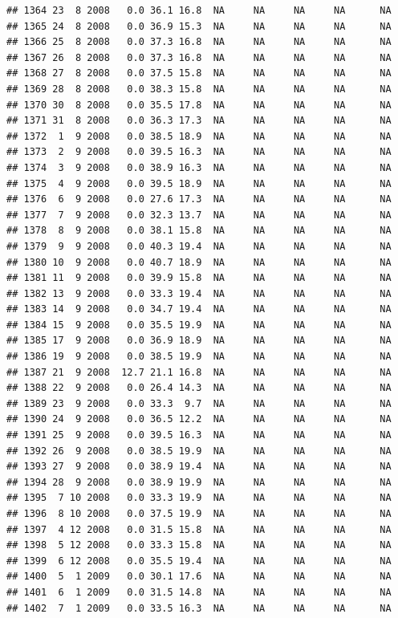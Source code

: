 \documentclass[
]{book}
\begin{document}
\begin{verbatim}
## 1364 23  8 2008   0.0 36.1 16.8  NA     NA     NA     NA      NA
## 1365 24  8 2008   0.0 36.9 15.3  NA     NA     NA     NA      NA
## 1366 25  8 2008   0.0 37.3 16.8  NA     NA     NA     NA      NA
## 1367 26  8 2008   0.0 37.3 16.8  NA     NA     NA     NA      NA
## 1368 27  8 2008   0.0 37.5 15.8  NA     NA     NA     NA      NA
## 1369 28  8 2008   0.0 38.3 15.8  NA     NA     NA     NA      NA
## 1370 30  8 2008   0.0 35.5 17.8  NA     NA     NA     NA      NA
## 1371 31  8 2008   0.0 36.3 17.3  NA     NA     NA     NA      NA
## 1372  1  9 2008   0.0 38.5 18.9  NA     NA     NA     NA      NA
## 1373  2  9 2008   0.0 39.5 16.3  NA     NA     NA     NA      NA
## 1374  3  9 2008   0.0 38.9 16.3  NA     NA     NA     NA      NA
## 1375  4  9 2008   0.0 39.5 18.9  NA     NA     NA     NA      NA
## 1376  6  9 2008   0.0 27.6 17.3  NA     NA     NA     NA      NA
## 1377  7  9 2008   0.0 32.3 13.7  NA     NA     NA     NA      NA
## 1378  8  9 2008   0.0 38.1 15.8  NA     NA     NA     NA      NA
## 1379  9  9 2008   0.0 40.3 19.4  NA     NA     NA     NA      NA
## 1380 10  9 2008   0.0 40.7 18.9  NA     NA     NA     NA      NA
## 1381 11  9 2008   0.0 39.9 15.8  NA     NA     NA     NA      NA
## 1382 13  9 2008   0.0 33.3 19.4  NA     NA     NA     NA      NA
## 1383 14  9 2008   0.0 34.7 19.4  NA     NA     NA     NA      NA
## 1384 15  9 2008   0.0 35.5 19.9  NA     NA     NA     NA      NA
## 1385 17  9 2008   0.0 36.9 18.9  NA     NA     NA     NA      NA
## 1386 19  9 2008   0.0 38.5 19.9  NA     NA     NA     NA      NA
## 1387 21  9 2008  12.7 21.1 16.8  NA     NA     NA     NA      NA
## 1388 22  9 2008   0.0 26.4 14.3  NA     NA     NA     NA      NA
## 1389 23  9 2008   0.0 33.3  9.7  NA     NA     NA     NA      NA
## 1390 24  9 2008   0.0 36.5 12.2  NA     NA     NA     NA      NA
## 1391 25  9 2008   0.0 39.5 16.3  NA     NA     NA     NA      NA
## 1392 26  9 2008   0.0 38.5 19.9  NA     NA     NA     NA      NA
## 1393 27  9 2008   0.0 38.9 19.4  NA     NA     NA     NA      NA
## 1394 28  9 2008   0.0 38.9 19.9  NA     NA     NA     NA      NA
## 1395  7 10 2008   0.0 33.3 19.9  NA     NA     NA     NA      NA
## 1396  8 10 2008   0.0 37.5 19.9  NA     NA     NA     NA      NA
## 1397  4 12 2008   0.0 31.5 15.8  NA     NA     NA     NA      NA
## 1398  5 12 2008   0.0 33.3 15.8  NA     NA     NA     NA      NA
## 1399  6 12 2008   0.0 35.5 19.4  NA     NA     NA     NA      NA
## 1400  5  1 2009   0.0 30.1 17.6  NA     NA     NA     NA      NA
## 1401  6  1 2009   0.0 31.5 14.8  NA     NA     NA     NA      NA
## 1402  7  1 2009   0.0 33.5 16.3  NA     NA     NA     NA      NA

\end{verbatim}
\end{document}
